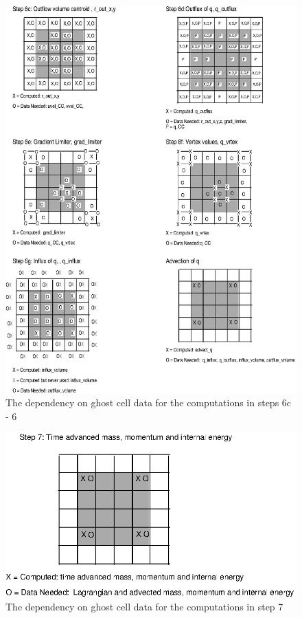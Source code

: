 \documentclass[fleqn]{article}
\begin{document}
{\begin{figure}
    \includegraphics{boundarycond_pg3.eps}
    \caption{The dependency on ghost cell data for the computations in steps 6c - 6}
    \label{fig:boundarycondpg3}
\end{figure}
%
%
\begin{figure}
    \center
    \includegraphics{boundarycond_pg4.eps}
    \caption{The dependency on ghost cell data for the computations in step 7}
    \label{fig:boundarycondpg4}
\end{figure}
%
\fi
\newpage

\newpage
}
\end{document}
